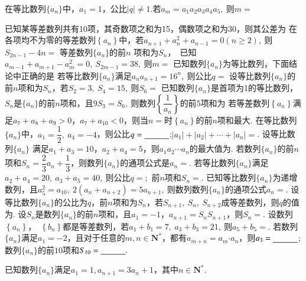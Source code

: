 \documentclass{BHCexam}
\begin{document}
\begin{questions}
\qs 在等比数列$\{a_n\}$中，$a_1=1$，公比$ \left|q\right|\ne 1 .$若$ a_m=a_1a_2a_3a_4a_5,~ $则$ m= $\xx
{}

\qs 已知某等差数列共有10项，其奇数项之和为15，偶数项之和为30，则其公差为\xx
{}
\qs 在各项均不为零的等差数列$\left\{a_n\right\}$中，若$ a_{n+1}+a^2_n+a_{n-1}=0(n\ge 2),~$则$ S_{2n-1}-4n= $\xx
{}
\qs 等差数列$\{a_n\}$的前$ n $ 项和为$S_n$，~已知$ a_{m-1}+a_{m+1}-a_m^2=0,~S_{2m-1}=38,~ $则$ m= $\xx
{}
\qs 已知数列$\{a_n\}$为等比数列，下面结论中正确的是\xx
{}
\qs 若等比数列$\{a_n\}$满足$ a_na_{n+1}=16^n,~ $则公比$ q= $\xx
{}
\qs 设等比数列$\{a_n\}$的前$n$项和为$S_n$，若$ S_2=3,~S_4=15,~ $则$ S_6= $\xx
{}
\qs 已知数列$\{a_n\}$是首项为1的等比数列，$S_n$是$\{a_n\}$的前$ n $项和，且$ 9S_3=S_6 ,~$则数列$ \left\{\dfrac{1}{a_n}\right\} $的前$ 5 $项和为\xx
{}
\qs 若等差数列$\left\{a_n\right\}$满足$ a_7+a_8+a_9>0$，$ a_7+a_{10}<0 $，则当$n=$\tk 时$\left\{a_n\right\}$的前$n$项和最大.  
\qs 在等比数列$\{a_n\}$中，$a_1=\dfrac{1}{2},~a_4=-4$，则公比$ q=\underline{\hspace{3em}} $;$ |a_1|+|a_2|+\cdots+|a_n|= $\tk. 
\qs 设等比数列$\{a_n\}$  满足$ a_1+a_3=10 $，$a_2+a_4=5$，则$ a_1a_2\cdots a_n $的最大值为\tk.
\qs 若数列$\{a_n\}$的前$n$项和$S_n=\dfrac{2}{3}a_n+\dfrac{1}{3}$，则数列$\{a_n\}$的通项公式是$a_n=$\tk. 
\qs 若等比数列$\{a_n\}$满足$ a_2+a_4=20,~a_3+a_5=40,~$则公比$ q= $\tk;~前$ n $项和$S_n=$\tk.
\qs 已知等比数列$\{a_n\}$为递增数列，且$ a_5^2=a_{10},~2(a_n+a_{n+2})=5a_{n+1},~ $则数列数列$\{a_n\}$的通项公式$ a_n= $\tk.
\qs 设等比数列$\{a_n\}$的公比为$ q $，前$n$项和为$S_n$，若$ S_{n+1},~S_n,~S_{n+2} $成等差数列，则$ q $的值为\tk.
\question
设$S_n$是数列$\{a_n\}$的前$n$项和，且$a_1=-1$，$a_{n+1}=S_nS_{n+1}$，则$S_n=$\tk.
\qs 设数列$\left\{a_n\right\}$，~$\left\{b_n\right\}$都是等差数列，若$ a_1+b_1=7,~a_3+b_3=21,~ $则$ a_5+b_5= $\tk.
\qs 若数列$\{a_n\}$满足$a_1=-2$，且对于任意的$ m,n \in\mathbf{N^*}$，都有$ a_{m+n}=a_m\bm{\cdot}a_n $，则$ a_3=\underline{\hspace{3em}} $;数列$\{a_n\}$的前$ 10 $项和$ S_{10}=\underline{\hspace{3em}}. $

\kongbai
\question
已知数列$\{a_n\}$满足$a_1=1,a_{n+1}=3a_n+1$，其中$n\in \mathbf{N^*}.$
\end{questions}
\end{document}

